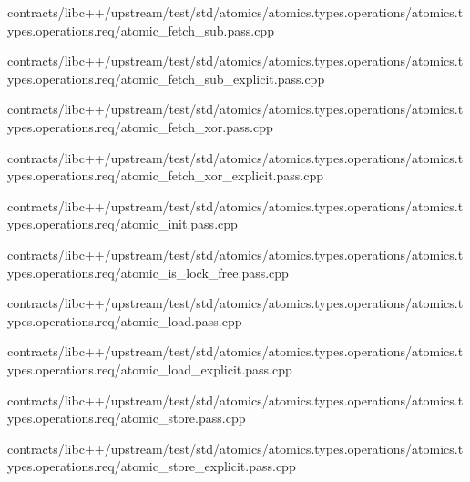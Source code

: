 \begin{DoxyCompactItemize}
contracts/libc++/upstream/test/std/atomics/atomics.\+types.\+operations/atomics.\+types.\+operations.\+req/atomic\+\_\+fetch\+\_\+sub.\+pass.\+cpp\item 
contracts/libc++/upstream/test/std/atomics/atomics.\+types.\+operations/atomics.\+types.\+operations.\+req/atomic\+\_\+fetch\+\_\+sub\+\_\+explicit.\+pass.\+cpp\item 
contracts/libc++/upstream/test/std/atomics/atomics.\+types.\+operations/atomics.\+types.\+operations.\+req/atomic\+\_\+fetch\+\_\+xor.\+pass.\+cpp\item 
contracts/libc++/upstream/test/std/atomics/atomics.\+types.\+operations/atomics.\+types.\+operations.\+req/atomic\+\_\+fetch\+\_\+xor\+\_\+explicit.\+pass.\+cpp\item 
contracts/libc++/upstream/test/std/atomics/atomics.\+types.\+operations/atomics.\+types.\+operations.\+req/atomic\+\_\+init.\+pass.\+cpp\item 
contracts/libc++/upstream/test/std/atomics/atomics.\+types.\+operations/atomics.\+types.\+operations.\+req/atomic\+\_\+is\+\_\+lock\+\_\+free.\+pass.\+cpp\item 
contracts/libc++/upstream/test/std/atomics/atomics.\+types.\+operations/atomics.\+types.\+operations.\+req/atomic\+\_\+load.\+pass.\+cpp\item 
contracts/libc++/upstream/test/std/atomics/atomics.\+types.\+operations/atomics.\+types.\+operations.\+req/atomic\+\_\+load\+\_\+explicit.\+pass.\+cpp\item 
contracts/libc++/upstream/test/std/atomics/atomics.\+types.\+operations/atomics.\+types.\+operations.\+req/atomic\+\_\+store.\+pass.\+cpp\item 
contracts/libc++/upstream/test/std/atomics/atomics.\+types.\+operations/atomics.\+types.\+operations.\+req/atomic\+\_\+store\+\_\+explicit.\+pass.\+cpp\end{DoxyCompactItemize}
